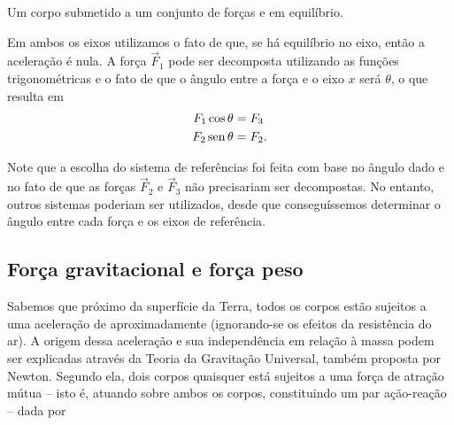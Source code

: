 \begin{marginfigure}[-5cm]
\centering
{}
\caption{Um corpo submetido a um conjunto de forças e em equilíbrio.\label{Fig:ExemploEquilibrioRef}}
\end{marginfigure}

\noindent{}Em ambos os eixos utilizamos o fato de que, se há equilíbrio no eixo, então a aceleração é nula. A força $\vec{F}_1$ pode ser decomposta utilizando as funções trigonométricas e o fato de que o ângulo entre a força e o eixo $x$ será $\theta$, o que resulta em
\begin{align}
    F_1 \cos\theta &= F_3 \\
    F_2 \operatorname{sen}\theta &= F_2.
\end{align}

Note que a escolha do sistema de referências foi feita com base no ângulo dado e no fato de que as forças $\vec{F}_2$ e $\vec{F}_3$ não precisariam ser decompostas. No entanto, outros sistemas poderiam ser utilizados, desde que conseguíssemos determinar o ângulo entre cada força e os eixos de referência.

\subsection{Força gravitacional e força peso} 

Sabemos que próximo da superfície da Terra, todos os corpos estão sujeitos a uma aceleração de aproximadamente  (ignorando-se os efeitos da resistência do ar). A origem dessa aceleração e sua independência em relação à massa podem ser explicadas através da Teoria da Gravitação Universal, também proposta por Newton. Segundo ela, dois corpos quaisquer está sujeitos a uma força de atração mútua -- isto é, atuando sobre ambos os corpos, constituindo um par ação-reação -- dada por

